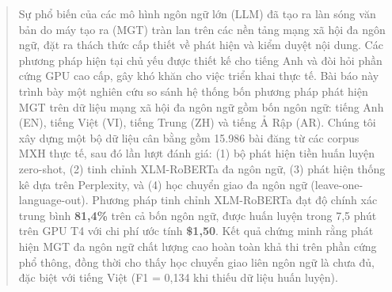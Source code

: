 
\begin{abstract}
Sự phổ biến của các mô hình ngôn ngữ lớn (LLM) đã tạo ra làn sóng
văn bản do máy tạo ra (MGT) tràn lan trên các nền tảng mạng xã hội
đa ngôn ngữ, đặt ra thách thức cấp thiết về phát hiện và kiểm duyệt
nội dung. Các phương pháp hiện tại chủ yếu được thiết kế cho tiếng Anh
và đòi hỏi phần cứng GPU cao cấp, gây khó khăn cho việc triển khai
thực tế. Bài báo này trình bày một nghiên cứu so sánh hệ thống bốn
phương pháp phát hiện MGT trên dữ liệu mạng xã hội đa ngôn ngữ gồm
bốn ngôn ngữ: tiếng Anh (EN), tiếng Việt (VI), tiếng Trung (ZH) và
tiếng Ả Rập (AR). Chúng tôi xây dựng một bộ dữ liệu cân bằng gồm
15.986 bài đăng từ các corpus MXH thực tế, sau đó lần lượt đánh giá:
(1) bộ phát hiện tiền huấn luyện zero-shot, (2) tinh chỉnh XLM-RoBERTa
đa ngôn ngữ, (3) phát hiện thống kê dựa trên Perplexity, và (4) học
chuyển giao đa ngôn ngữ (leave-one-language-out). Phương
pháp tinh chỉnh XLM-RoBERTa đạt độ chính xác trung bình \textbf{81,4\%}
trên cả bốn ngôn ngữ, được huấn luyện trong 7,5 phút trên GPU
T4 với chi phí ước tính \textbf{\$1,50}. Kết quả chứng minh rằng phát
hiện MGT đa ngôn ngữ chất lượng cao hoàn toàn khả thi trên phần cứng
phổ thông, đồng thời cho thấy học chuyển giao liên ngôn ngữ là chưa
đủ, đặc biệt với tiếng Việt (F1 = 0,134 khi thiếu dữ liệu huấn luyện).

\end{abstract}
